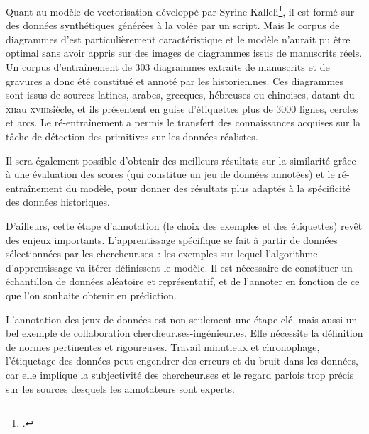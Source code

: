 Quant au modèle de vectorisation développé par Syrine
Kalleli\footcite{kalleli_historical_2024}, il est formé
sur des données synthétiques générées à la volée par un script. Mais le
corpus de diagrammes d'\eida est particulièrement caractéristique et le
modèle n'aurait pu être optimal sans avoir appris sur des images de
diagrammes issus de manuscrits réels. Un corpus d'entraînement de 303
diagrammes extraits de manuscrits et de gravures a donc été constitué et
annoté par les historien.nes. Ces diagrammes sont issus de sources latines, arabes,
grecques, hébreuses ou chinoises, datant du \textsc{xii}\ieme au \textsc{xviii}\ieme siècle, et ils
présentent en guise d'étiquettes plus de 3000 lignes, cercles et arcs. Le
ré-entraînement a permis le transfert des connaissances acquises sur la
tâche de détection des primitives sur les données réalistes.

Il sera également possible d'obtenir des meilleurs résultats sur la
similarité grâce à une évaluation des scores (qui constitue un jeu de
données annotées) et le ré-entraînement du modèle, pour donner des
résultats plus adaptés à la spécificité des données historiques.

D'ailleurs, cette étape d'annotation (le choix des exemples et des
étiquettes) revêt des enjeux importants. L'apprentissage spécifique se
fait à partir de données sélectionnées par les chercheur.ses~: les exemples
sur lequel l'algorithme d'apprentissage va itérer définissent le modèle.
Il est nécessaire de constituer un échantillon de données aléatoire et
représentatif, et de l'annoter en fonction de ce que l'on souhaite
obtenir en prédiction.

L'annotation des jeux de données est non seulement une étape clé, mais
aussi un bel exemple de collaboration chercheur.ses-ingénieur.es. Elle
nécessite la définition de normes pertinentes et rigoureuses. Travail
minutieux et chronophage, l'étiquetage des données peut engendrer des
erreurs et du bruit dans les données, car elle implique la subjectivité
des chercheur.ses et le regard parfois trop précis sur les sources desquels
les annotateurs sont experts.

